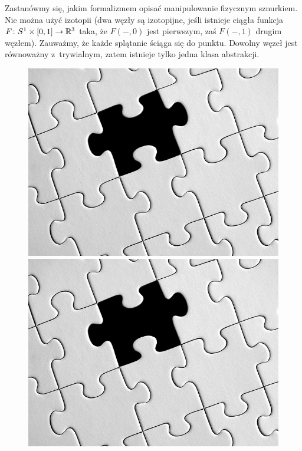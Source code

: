 Zastanówmy się, jakim formalizmem opisać manipulowanie fizycznym sznurkiem.
Nie można użyć izotopii
(dwa węzły są izotopijne, jeśli istnieje ciągła funkcja $F \colon S^1 \times [0, 1] \to \mathbb R^3$ taka, że $F(-, 0)$ jest pierwszym, zaś $F(-,1)$ drugim węzłem).
Zauważmy, że każde splątanie ściąga się do punktu.
Dowolny węzeł jest równoważny z~trywialnym, zatem istnieje tylko jedna klasa abstrakcji.
\begin{figure}[H]
    \begin{minipage}[b]{.23\linewidth}
        \centering
        \includegraphics[width=\linewidth]{../data/missing.jpg}
    \end{minipage}
    \begin{minipage}[b]{.23\linewidth}
        \centering
        \includegraphics[width=\linewidth]{../data/missing.jpg}

\end{minipage}
\end{figure}
